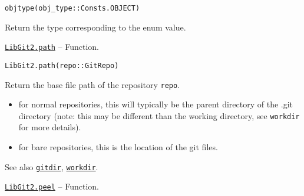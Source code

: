 \begin{adjustwidth}{2em}{0pt}


\begin{verbatim}
objtype(obj_type::Consts.OBJECT)
\end{verbatim}

Return the type corresponding to the enum value.



\end{adjustwidth}
\hypertarget{7655803558162329563}{} 
\hyperlink{7655803558162329563}{\texttt{LibGit2.path}}  -- {Function.}

\begin{adjustwidth}{2em}{0pt}


\begin{verbatim}
LibGit2.path(repo::GitRepo)
\end{verbatim}

Return the base file path of the repository \texttt{repo}.

\begin{itemize}
\item for normal repositories, this will typically be the parent directory of the {\textquotedbl}.git{\textquotedbl} directory (note: this may be different than the working directory, see \texttt{workdir} for more details).


\item for bare repositories, this is the location of the {\textquotedbl}git{\textquotedbl} files.

\end{itemize}
See also \hyperlink{12125979754140967861}{\texttt{gitdir}}, \hyperlink{6689577338311178757}{\texttt{workdir}}.



\end{adjustwidth}
\hypertarget{16139465008527879046}{} 
\hyperlink{16139465008527879046}{\texttt{LibGit2.peel}}  -- {Function.}

